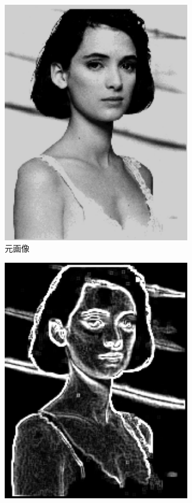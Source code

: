 \documentclass[a4paper,12pt]{jsarticle}
\begin{document}
\begin{figure}[!htbp]
\centering
\begin{subfigure}[b]{0.45\textwidth}
    \centering
    \includegraphics[width=0.9\textwidth]{./sampleimages/sample7.png}
    \caption{元画像}
\end{subfigure}
\hfill
\begin{subfigure}[b]{0.45\textwidth}
    \centering
    \includegraphics[width=0.9\textwidth]{./images/edge_enhanced_sample7_edge.png}

\end{subfigure}
\end{figure}
\end{document}
